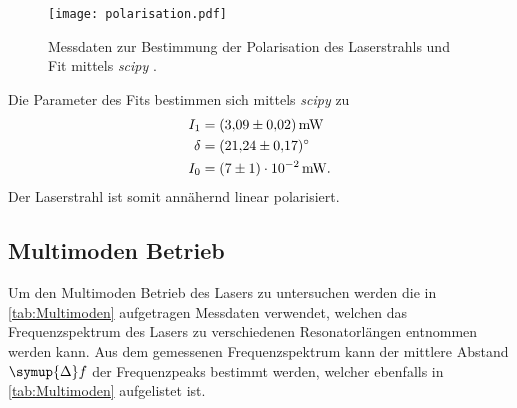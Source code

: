 \begin{figure}
  \centering
  \texttt{[image: polarisation.pdf]}
  \caption{Messdaten zur Bestimmung der Polarisation des Laserstrahls und Fit mittels \textit{scipy} \cite{scipy}.}
  \label{fig:polarisation}
\end{figure}
Die Parameter des Fits bestimmen sich mittels \textit{scipy} \cite{scipy} zu 
\begin{align*}
  I_1 &= \qty{3.09 +- 0.02}{\milli\watt} \\
  \delta &= \qty{21.24 +- 0.17}{\degree} \\ %
  I_0 &= \qty{7 +- 1e-02}{\milli\watt}.
\end{align*}
Der Laserstrahl ist somit annähernd linear polarisiert.

\subsection{Multimoden Betrieb}
Um den Multimoden Betrieb des Lasers zu untersuchen werden die in \autoref{tab:Multimoden} aufgetragen Messdaten verwendet, welchen das Frequenzspektrum des Lasers zu verschiedenen
Resonatorlängen entnommen werden kann. Aus dem gemessenen Frequenzspektrum kann der mittlere Abstand $\symup{\Delta}f$ der Frequenzpeaks bestimmt werden, welcher ebenfalls in 
\autoref{tab:Multimoden} aufgelistet ist.
